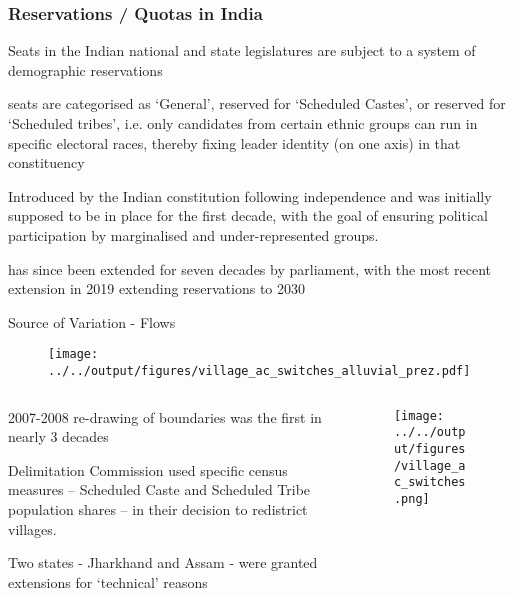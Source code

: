\documentclass[12pt, aspectratio=169]{beamer}
\begin{document}
\begin{frame}[t]\frametitle{Reservations / Quotas in India}

\bi
  \item Seats in the Indian national and state legislatures are
  subject to a system of demographic reservations
  \item seats are categorised as `General', reserved for `Scheduled
    Castes', or reserved for `Scheduled tribes', i.e. only candidates
    from certain ethnic groups can run in specific electoral races,
    thereby fixing leader identity (on one axis) in that constituency
  \item Introduced by the Indian constitution following independence
  and was initially supposed to be in place for the first decade, with
  the goal of ensuring political participation by marginalised and
  under-represented groups.
\item has since been extended for seven decades by parliament, with
  the most recent extension in 2019 extending reservations to 2030
\ei


\end{frame}



\begin{frame}{Source of Variation - Flows}
\begin{figure}[tb]
  \centering
  \texttt{[image: ../../output/figures/village\_ac\_switches\_alluvial\_prez.pdf]}
  \label{fig:switch_alluvial}
\end{figure}
\end{frame}

\begin{frame}
\begin{columns}
\begin{column}{0.5\textwidth}
\bi
  \item 2007-2008 re-drawing of boundaries was the first in nearly 3
  decades
  \item Delimitation Commission used specific census measures --
  Scheduled Caste and Scheduled Tribe population shares -- in their
  decision to redistrict villages.
  \item Two states - Jharkhand and Assam - were granted extensions for
  `technical' reasons
\ei
\end{column}
\begin{column}{0.5\textwidth}
\begin{figure}[tb]
  \centering
  \texttt{[image: ../../output/figures/village\_ac\_switches.png]}
  \label{fig:switch_map}
\end{figure}

\end{column}
\end{columns}


\end{frame}
\end{document}
